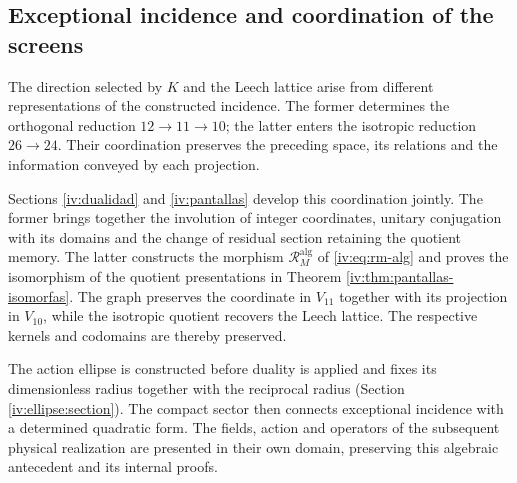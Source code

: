\subsection{Exceptional incidence and coordination of the screens}
\label{exc:pantallas-dualidad}

The direction selected by \(K\) and the Leech lattice arise
from different representations of the constructed incidence. The former
determines the orthogonal reduction \(12\to11\to10\); the latter
enters the isotropic reduction \(26\to24\). Their coordination
preserves the preceding space, its relations and the information conveyed
by each projection.

Sections \ref{iv:dualidad} and \ref{iv:pantallas} develop
this coordination jointly. The former brings together the involution of
integer coordinates, unitary conjugation with its domains and the
change of residual section retaining the quotient memory. The latter
constructs the morphism \(\mathcal R_M^{\mathrm{alg}}\) of
\eqref{iv:eq:rm-alg} and proves the isomorphism of the
quotient presentations in Theorem \ref{iv:thm:pantallas-isomorfas}.
The graph preserves the coordinate in \(V_{11}\) together with its projection
in \(V_{10}\), while the isotropic quotient recovers the
Leech lattice. The respective kernels and codomains are thereby preserved.

The action ellipse is constructed before duality is applied and fixes
its dimensionless radius together with the reciprocal radius
(Section \ref{iv:ellipse:section}). The compact sector then connects
exceptional incidence with a determined quadratic form. The
fields, action and operators of the subsequent physical realization
are presented in their own domain, preserving this algebraic
antecedent and its internal proofs.

